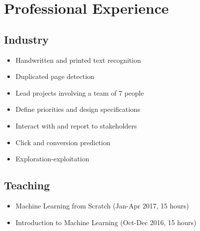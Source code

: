 \documentclass[11pt,a4paper,sans]{moderncv}   %
\begin{document}
\makecvtitle

\section{Professional Experience}

\subsection{Industry}

{
\begin{itemize}
	\item Handwritten and printed text recognition
	\item Duplicated page detection
\end{itemize}
}

{
\begin{itemize}
	\item Lead projects involving a team of 7 people
	\item Define priorities and design specifications
	\item Interact with and report to stakeholders
\end{itemize}
}
\vspace*{-1em}
{
\begin{itemize}
	\item Click and conversion prediction
	\item Exploration-exploitation
\end{itemize}
}

\subsection{Teaching}

{
\begin{itemize}
	\item Machine Learning from Scratch (Jan-Apr 2017, 15 hours)
	\item Introduction to Machine Learning (Oct-Dec 2016, 15 hours)
\end{itemize}
}
\end{document}
